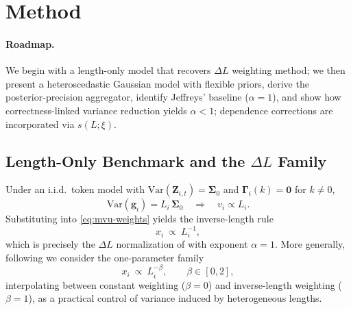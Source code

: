 \section{Method}\label{sec:method}

\paragraph{Roadmap.}
We begin with a length-only model that recovers $\Delta L$ weighting method; we then present a heteroscedastic Gaussian model with flexible priors, derive the posterior-precision aggregator, identify Jeffreys’ baseline ($\alpha{=}1$), and show how correctness-linked variance reduction yields $\alpha{<}1$; dependence corrections are incorporated via $s(L;\xi)$.

\subsection{Length-Only Benchmark and the \texorpdfstring{$\Delta L$}{Delta L}  Family}\label{subsec:warmup}
Under an i.i.d.\ token model with $\mathrm{Var}(\boldsymbol{Z}_{i,t})=\boldsymbol{\Sigma}_0$ and $\boldsymbol{\Gamma}_i(k)=\boldsymbol{0}$ for $k\neq 0$,
\begin{equation}
  \mathrm{Var}(\boldsymbol{g}_i)=L_i\,\boldsymbol{\Sigma}_0
  \quad\Longrightarrow\quad
  v_i \propto L_i.
\end{equation}
Substituting into \eqref{eq:mvu-weights} yields the inverse-length rule
\begin{equation}
  x_i \ \propto\ L_i^{-1},
  \label{eq:deltaL_alpha1}
\end{equation}
which is precisely the $\Delta L$ normalization of \citet{he2025deltal} with exponent $\alpha=1$. More generally, following \citet{he2025deltal} we consider the one-parameter family
\begin{equation}
  x_i \ \propto\ L_i^{-\beta},\qquad \beta\in[0,2],
  \label{eq:ldependence}
\end{equation}
interpolating between constant weighting ($\beta=0$) and inverse-length weighting ($\beta=1$), as a practical control of variance induced by heterogeneous lengths.

